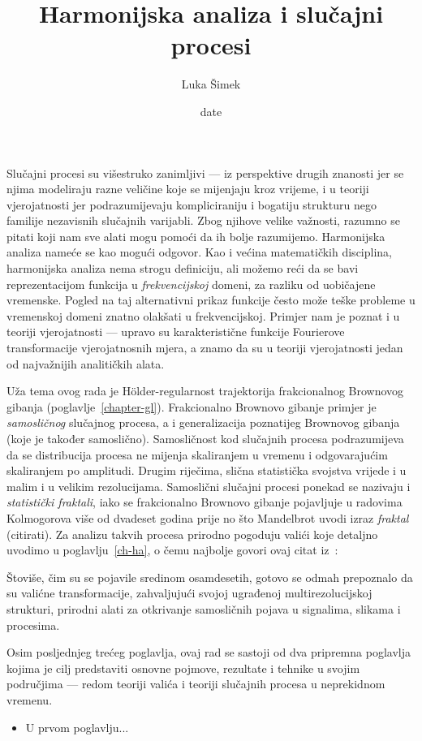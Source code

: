\documentclass[a4paper,twoside,12pt]{memoir}
\title{Harmonijska analiza i slu\v{c}ajni procesi}
\author{Luka Šimek}
\date{date}
\numberwithin{teorem}{section}
\numberwithin{equation}{chapter}
\numberwithin{figure}{chapter}
\numberwithin{table}{chapter}
\newcommand{\holder}{H\" older}
\begin{document}
\nocite{*}
\frontmatter

\begin{intro}
	Slučajni procesi su višestruko zanimljivi --- iz perspektive drugih znanosti jer
	se njima modeliraju razne veličine koje se mijenjaju kroz vrijeme, i u teoriji vjerojatnosti
	jer podrazumijevaju kompliciraniju i bogatiju strukturu nego familije nezavisnih
	slučajnih varijabli. Zbog njihove velike važnosti, razumno se pitati koji nam
	sve alati mogu pomoći da ih bolje razumijemo. Harmonijska analiza nameće se kao mogući odgovor.
	Kao i većina matematičkih disciplina, harmonijska analiza nema strogu definiciju, ali
	možemo reći da se bavi reprezentacijom funkcija u \emph{frekvencijskoj} domeni, za razliku
	od uobičajene vremenske. Pogled na taj alternativni prikaz funkcije često može teške
	probleme u vremenskoj domeni znatno olakšati u frekvencijskoj. Primjer nam
	je poznat i u teoriji vjerojatnosti --- upravo su karakteristične funkcije Fourierove transformacije
	vjerojatnosnih mjera, a znamo da su u teoriji vjerojatnosti jedan od najvažnijih analitičkih alata.

	Uža tema ovog rada je \holder -regularnost trajektorija frakcionalnog Brownovog gibanja (poglavlje~\ref{chapter-gl}).
	Frakcionalno Brownovo gibanje primjer je \emph{samosličnog} slučajnog procesa, a i generalizacija poznatijeg Brownovog gibanja (koje je također samoslično). Samosličnost kod slučajnih procesa
	podrazumijeva da se distribucija procesa ne mijenja skaliranjem u vremenu i odgovarajućim skaliranjem po amplitudi. Drugim riječima, slična statistička svojstva
	vrijede i u malim i u velikim rezolucijama. Samoslični slučajni procesi ponekad se nazivaju i \emph{statistički fraktali}, iako se frakcionalno Brownovo gibanje
	pojavljuje u radovima Kolmogorova više od dvadeset godina prije no što Mandelbrot uvodi izraz \emph{fraktal} (citirati). Za analizu takvih procesa
	prirodno pogoduju valići koje detaljno uvodimo u poglavlju~\ref{ch-ha}, o čemu najbolje govori ovaj citat iz~\cite[str.~22.]{flandrin}:
	\begin{displayquote}
		Štoviše, čim su se pojavile sredinom osamdesetih, gotovo se odmah prepoznalo da su valićne transformacije,
		zahvaljujući svojoj ugrađenoj multirezolucijskoj strukturi, prirodni alati
		za otkrivanje samosličnih pojava u signalima, slikama i procesima.
	\end{displayquote}

	\bigskip
	Osim posljednjeg trećeg poglavlja, ovaj rad se sastoji od dva pripremna poglavlja kojima je cilj
	predstaviti osnovne pojmove, rezultate i tehnike u svojim područjima --- redom teoriji valića i teoriji
	slučajnih procesa u neprekidnom vremenu.
	\begin{itemize}
		\item U prvom poglavlju...


\end{itemize}
\end{intro}
\end{document}
